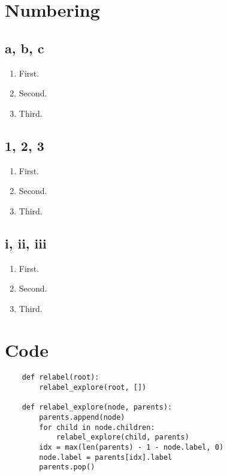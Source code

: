 \documentclass{article}
\title{\vspace{-2cm}\DocumentTitle{}}
\author{\Name{} (SID \StudentID{})}
\date{}
\begin{document}
\newcommand{\AND}{\wedge}
\newcommand{\OR}{\vee}

\maketitle

\section{Numbering}

\subsection{a, b, c}
\begin{enumerate}[label = {\alph*)}]
    \item First.
    \item Second.
    \item Third.
\end{enumerate}

\subsection{1, 2, 3}
\begin{enumerate}[label = {\arabic*)}]
    \item First.
    \item Second.
    \item Third.
\end{enumerate}

\subsection{i, ii, iii}
\begin{enumerate}[label = {\roman*)}]
    \item First.
    \item Second.
    \item Third.
\end{enumerate}

\newpage
\section{Code}

\begin{verbatim}
    def relabel(root):
        relabel_explore(root, [])

    def relabel_explore(node, parents):
        parents.append(node)
        for child in node.children:
            relabel_explore(child, parents)
        idx = max(len(parents) - 1 - node.label, 0)
        node.label = parents[idx].label
        parents.pop()
\end{verbatim}
\end{document}

